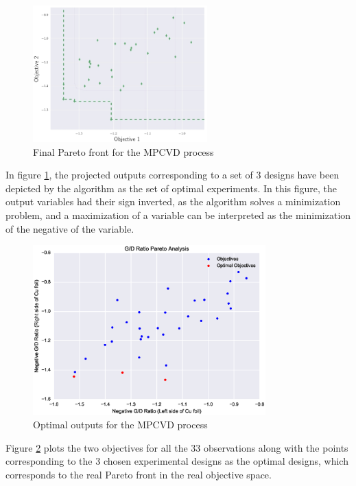 \documentclass{article}
\begin{document}
\begin{figure}[!t]
\centering
    \includegraphics[width=0.6\textwidth]{ParetoFrontImage}
    \caption{Final Pareto front for the MPCVD process}
    \label{pareto_cvd}
\label{cvd_pareto}
\end{figure}

In figure \ref{cvd_pareto}, the projected outputs corresponding to a set of 3 designs have been depicted by the algorithm as the set of optimal experiments. In this figure, the output variables had their sign inverted, as the algorithm solves a minimization problem, and a maximization of a variable can be interpreted as the minimization of the negative of the variable.

\begin{figure}[!t]
\centering
    \includegraphics[width=0.8\textwidth]{Cu_foil_pareto}
    \caption{Optimal outputs for the MPCVD process}
    \label{optimal_cvd}
\label{cvd_results}
\end{figure}

Figure \ref{cvd_results} plots the two objectives for all the 33 observations along with the points corresponding to the 3 chosen experimental designs as the optimal designs, which corresponds to the real Pareto front in the real objective space.
\end{document}
